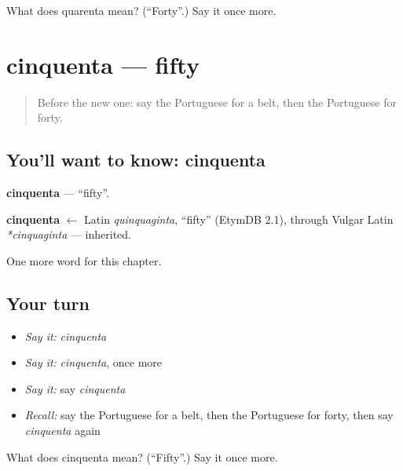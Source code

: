 \begin{tcolorbox}[breakable,colback=teal!4,colframe=teal!35!black,title={Before you move on}]
What does quarenta mean? (\textquotedblleft{}Forty\textquotedblright{}.) Say it once more.
\end{tcolorbox}
\section[cinquenta]{cinquenta — fifty}

\label{lesson:PT-C79-cinquenta}



\begin{quote}
Before the new one: say the Portuguese for a belt, then the Portuguese for forty.
\end{quote}

\subsection*{You'll want to know: cinquenta}
\textbf{cinquenta} — \textquotedblleft{}fifty\textquotedblright{}.

\begin{cousinweb}
\textbf{cinquenta} $\leftarrow$ Latin \emph{quinquaginta}, \textquotedblleft{}fifty\textquotedblright{} (EtymDB 2.1), through Vulgar Latin \emph{*cinquaginta} — inherited.
\end{cousinweb}

\begin{grammarlens}[title={What you've built}]
One more word for this chapter.
\end{grammarlens}

\subsection*{Your turn}
\begin{itemize}
\raggedright
  \item \emph{Say it:} \emph{cinquenta}
  \item \emph{Say it:} \emph{cinquenta}, once more
  \item \emph{Say it:} say \emph{cinquenta}
  \item \emph{Recall:} say the Portuguese for a belt, then the Portuguese for forty, then say \emph{cinquenta} again
\end{itemize}

\begin{tcolorbox}[breakable,colback=teal!4,colframe=teal!35!black,title={Before you move on}]
What does cinquenta mean? (\textquotedblleft{}Fifty\textquotedblright{}.) Say it once more.
\end{tcolorbox}
